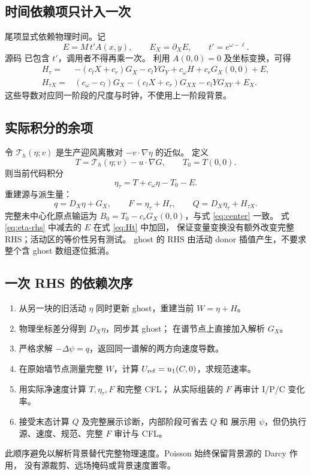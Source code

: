 \documentclass[UTF8,fontset=fandol,11pt,a4paper]{ctexart}
\newcommand{\code}[1]{\texttt{\detokenize{#1}}}
\newcommand{\Dx}{D_X}
\begin{document}
\subsection{时间依赖项只计入一次}
尾项显式依赖物理时间。记
\begin{equation}
 E=M\,t'A(x,y),\qquad E_X=\partial_XE,\qquad t'=e^{\omega-\ell}.
 \label{eq:explicit-time}
\end{equation}
源码 \code{timeH/timeX} 已包含 $t'$，调用者不得再乘一次。
利用 $A(0,0)=0$ 及坐标变换，可得
\begin{align}
 H_\tau={}&-(c_lX+c_r)G_X-c_lYG_Y+c_\omega H
              +c_rG_X(0,0)+E, \label{eq:Ht}\\
 H_{\tau X}={}&(c_\omega-c_l)G_X
       -(c_lX+c_r)G_{XX}-c_lYG_{XY}+E_X.
 \label{eq:Htx}
\end{align}
这些导数对应同一阶段的尺度与时钟，不使用上一阶段背景。

\subsection{实际积分的余项}
令 $\mathcal T_h(\eta;v)$ 是生产迎风离散对 $-v\cdot\nabla\eta$ 的近似。
定义
\begin{equation}
 T=\mathcal T_h(\eta;v)-u\cdot\nabla G,\qquad T_0=T(0,0).
\end{equation}
则当前代码积分
\begin{equation}
 \eta_\tau=T+c_\omega\eta-T_0-E.
 \label{eq:eta-rhs}
\end{equation}
重建源与派生量：
\begin{equation}
 q=\Dx\eta+G_X,\qquad
 F=\eta_\tau+H_\tau,\qquad
 Q=\Dx\eta_\tau+H_{\tau X}.
 \label{eq:observables}
\end{equation}
完整未中心化原点输运为
$B_0=T_0-c_rG_X(0,0)$，与式 \eqref{eq:center} 一致。
式 \eqref{eq:eta-rhs} 中减去的 $E$ 在式 \eqref{eq:Ht} 中加回，
保证变量变换没有额外改变完整 RHS；活动区的等价性另有测试。
ghost 的 RHS 由活动 donor 插值产生，不要求整个含 ghost 数组逐位抵消。

\subsection{一次 RHS 的依赖次序}
\begin{enumerate}
 \item 从另一块的旧活动 $\eta$ 同时更新 ghost，重建当前 $W=\eta+H$。
 \item 物理坐标差分得到 $\Dx\eta$，同步其 ghost；
       在谱节点上直接加入解析 $G_X$。
 \item 严格求解 $-\Delta\psi=q$，返回同一谱解的两方向速度导数。
 \item 在原始墙节点测量完整 $W$，计算
       $U_{\rm ref}=u_1(C,0)$，求规范速率。
 \item 用实际净速度计算 $T,\eta_\tau,F$ 和完整 CFL；
       从实际组装的 $F$ 再审计 I/P/C 变化率。
 \item 接受末态计算 $Q$ 及完整展示诊断，内部阶段可省去 $Q$ 和
       展示用 $\psi$，但仍执行源、速度、规范、完整 $F$ 审计与 CFL。
\end{enumerate}
此顺序避免以解析背景替代完整物理速度。Poisson 始终保留背景源的 Darcy 作用，
没有源裁剪、远场掩码或背景速度置零。
\end{document}
